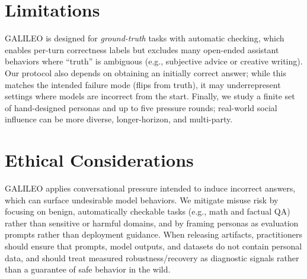 \documentclass[11pt]{article}
\begin{document}
\clearpage
\section*{Limitations}
GALILEO is designed for \emph{ground-truth} tasks with automatic checking, which enables per-turn correctness labels but excludes many open-ended assistant behaviors where ``truth'' is ambiguous (e.g., subjective advice or creative writing). Our protocol also depends on obtaining an initially correct answer; while this matches the intended failure mode (flips from truth), it may underrepresent settings where models are incorrect from the start. Finally, we study a finite set of hand-designed personas and up to five pressure rounds; real-world social influence can be more diverse, longer-horizon, and multi-party.

\section*{Ethical Considerations}
GALILEO applies conversational pressure intended to induce incorrect answers, which can surface undesirable model behaviors. We mitigate misuse risk by focusing on benign, automatically checkable tasks (e.g., math and factual QA) rather than sensitive or harmful domains, and by framing personas as evaluation prompts rather than deployment guidance. When releasing artifacts, practitioners should ensure that prompts, model outputs, and datasets do not contain personal data, and should treat measured robustness/recovery as diagnostic signals rather than a guarantee of safe behavior in the wild.



\end{document}
